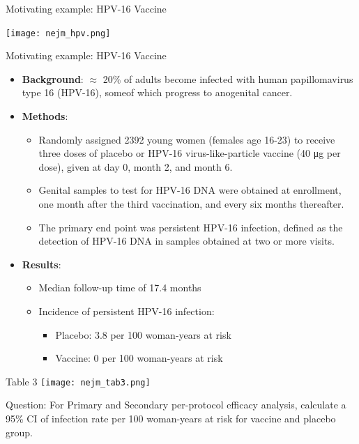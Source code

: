 \documentclass[10pt,handout]{beamer}\usepackage[]{graphicx}\usepackage[]{color}
\begin{document}
\begin{frame}{Motivating example: HPV-16 Vaccine}
	
	\texttt{[image: nejm\_hpv.png]}
	
\end{frame}


\begin{frame}{Motivating example: HPV-16 Vaccine}
	\footnotesize
	\begin{itemize}
		\item \textbf{Background}: $\approx$ 20\% of adults become infected with human papillomavirus type 16 (HPV-16), someof which progress to anogenital cancer. 
		\pause
		\item \textbf{Methods}: 
		\begin{itemize}
			\footnotesize
			\item Randomly assigned 2392 young women (females age 16-23) to receive three doses of placebo or HPV-16 virus-like-particle vaccine (40 μg per dose), given at day 0, month 2, and month 6. 
			\item Genital samples to test for HPV-16 DNA were obtained at enrollment,	one month after the third vaccination, and every six months thereafter. 
			\item The primary end point was persistent HPV-16 infection, defined as the detection of HPV-16 DNA in samples obtained at two or more visits. 
		\end{itemize}
		\pause 
		\item \textbf{Results}: \begin{itemize}
			\footnotesize
			\item Median follow-up time of 17.4 months
			\item Incidence of persistent HPV-16 infection: \begin{itemize}
				\footnotesize
				\item Placebo: 3.8 per 100 woman-years at risk
				\item Vaccine: 0 per 100 woman-years at risk
			\end{itemize}
		\end{itemize}
	\end{itemize}
\end{frame}


\begin{frame}{Table 3}
	\texttt{[image: nejm\_tab3.png]}
	
	\vspace{0.5in}
	\alert{Question}: For Primary and Secondary per-protocol efficacy analysis, calculate a 95\% CI of infection rate per 100 woman-years at risk for vaccine and placebo group.
	
\end{frame}
\end{document}

